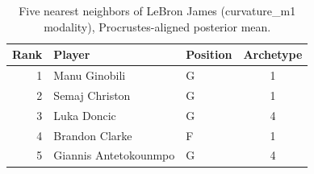 \begin{table}[htbp]
  \centering\small
  \begin{tabular}{rllc}
    \toprule
    Rank & Player & Position & Archetype \\
    \midrule
    1 & Manu Ginobili & G & 1 \\
    2 & Semaj Christon & G & 1 \\
    3 & Luka Doncic & G & 4 \\
    4 & Brandon Clarke & F & 1 \\
    5 & Giannis Antetokounmpo & G & 4 \\
    \bottomrule
  \end{tabular}
  \caption{Five nearest neighbors of LeBron James (curvature_m1 modality), Procrustes-aligned posterior mean.}
  \label{tab:LeBron_James_neighbors_curvature_m1}
\end{table}

